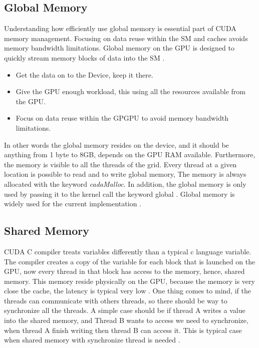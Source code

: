 \subsection{Global Memory}

Understanding how efficiently use global memory is essential part of CUDA memory management. Focusing on data reuse within the SM and caches avoids memory bandwidth limitations. Global memory on the GPU is designed to quickly stream memory blocks of data into the SM \cite{design}.

\begin{itemize}
\item Get the data on to the Device, keep it there.
\item Give the GPU enough workload, this using all the resources available from the GPU.
\item Focus on data reuse within the GPGPU to avoid memory bandwidth limitations.
\end{itemize}

In other words the global memory resides on the device, and it should be anything from 1 byte to 8GB, depends on the GPU RAM available. Furthermore, the memory is visible to all the threads of the grid. Every thread at a given location is possible to read and to write global memory, The memory is always allocated with the keyword \textit{cadaMalloc}. In addition, the global memory is only used by passing it to the kernel call the keyword \twoline global \twoline. Global memory is widely used for the current implementation \cite{design}.

\subsection{Shared Memory}

CUDA C compiler treats variables differently than a typical c language variable. The compiler creates a copy of the variable for each block that is launched on the GPU, now every thread in that block has access to the memory, hence, shared memory. This memory reside physically on the GPU, because the memory is very close the cache, the latency is typical very low \cite{example}. One thing comes to mind, if the threads can communicate with others threads, so there should be way to synchronize all the threads. A simple case should be if thread A writes a value into the shared memory, and Thread B wants to access we need to synchronize, when thread A finish writing then thread B can access it. This is typical case when shared memory with synchronize thread is needed \cite{cook}.


